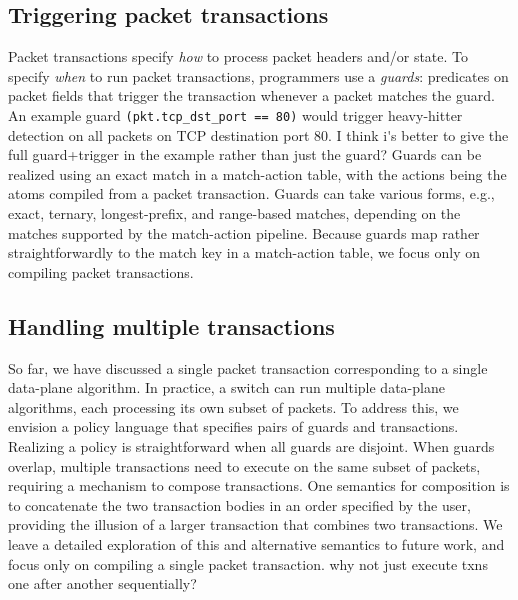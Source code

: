\subsection{Triggering packet transactions}
\label{ss:guards}
Packet transactions specify \textit{how} to process packet headers and/or
state.  To specify {\em when} to run packet transactions, programmers use a {\em
guards}: predicates on packet fields that trigger the transaction whenever a
packet matches the guard. An example guard {\tt (pkt.tcp\_dst\_port == 80)} would
trigger heavy-hitter detection on all packets on TCP destination port 80.
\ac{I think i's better to give the full guard+trigger in the example rather than 
just the guard?} 
Guards can be realized using an exact match in a match-action table, with the
actions being the atoms compiled from a packet transaction. Guards
can take various forms, e.g., exact, ternary, longest-prefix, and range-based
matches, depending on the matches supported by the match-action
pipeline. Because guards map rather straightforwardly to the match key in a
match-action table, we focus only on compiling packet transactions.


\subsection{Handling multiple transactions}
\label{ss:multiple}
So far, we have discussed a single packet transaction corresponding to a single
data-plane algorithm. In practice, a switch can run multiple data-plane
algorithms, each processing its own subset of packets. To address this, we
envision a policy language that specifies pairs of guards and transactions.
Realizing a policy is straightforward when all guards are disjoint. When guards
overlap, multiple transactions need to execute on the same subset of packets,
requiring a mechanism to compose transactions. One semantics for composition is
to concatenate the two transaction bodies in an order specified by the user,
providing the illusion of a larger transaction that combines two transactions.
We leave a detailed exploration of this and alternative semantics to future
work, and focus only on compiling a single packet transaction.
\ac{why not just execute txns one after another sequentially?}



